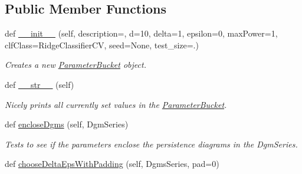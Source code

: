 \subsection*{Public Member Functions}
\begin{DoxyCompactItemize}
\item 
def \hyperlink{classteaspoon_1_1_m_l_1_1tents_1_1_parameter_bucket_a3134297e20272c91ac6ab54a92efb6e5}{\+\_\+\+\_\+init\+\_\+\+\_\+} (self, description=\textquotesingle{}\textquotesingle{}, d=10, delta=1, epsilon=0, max\+Power=1, clf\+Class=Ridge\+Classifier\+CV, seed=None, test\+\_\+size=.)
\begin{DoxyCompactList}\small\item\em Creates a new \hyperlink{classteaspoon_1_1_m_l_1_1tents_1_1_parameter_bucket}{Parameter\+Bucket} object. \end{DoxyCompactList}\item 
\mbox{\label{classteaspoon_1_1_m_l_1_1tents_1_1_parameter_bucket_a39e9d1148208dce4a8dec9354afb789d}} 
def \hyperlink{classteaspoon_1_1_m_l_1_1tents_1_1_parameter_bucket_a39e9d1148208dce4a8dec9354afb789d}{\+\_\+\+\_\+str\+\_\+\+\_\+} (self)
\begin{DoxyCompactList}\small\item\em Nicely prints all currently set values in the \hyperlink{classteaspoon_1_1_m_l_1_1tents_1_1_parameter_bucket}{Parameter\+Bucket}. \end{DoxyCompactList}\item 
def \hyperlink{classteaspoon_1_1_m_l_1_1tents_1_1_parameter_bucket_afbc1ce46c67e2a86a72d93cdcba558ea}{enclose\+Dgms} (self, Dgm\+Series)
\begin{DoxyCompactList}\small\item\em Tests to see if the parameters enclose the persistence diagrams in the Dgm\+Series. \end{DoxyCompactList}\item 
def \hyperlink{classteaspoon_1_1_m_l_1_1tents_1_1_parameter_bucket_a4dd95135123384b08f2e8fccd11e7d27}{choose\+Delta\+Eps\+With\+Padding} (self, Dgms\+Series, pad=0)
\end{DoxyCompactItemize}
